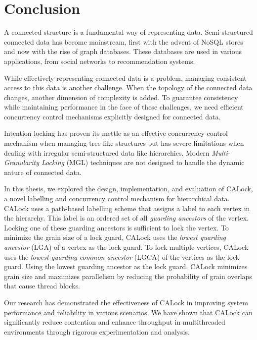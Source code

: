 %

\chapter{Conclusion} \label{chap:conclusion}

A connected structure is a fundamental way of representing data. Semi-structured connected data has become mainstream, first with the advent of NoSQL stores and now with the rise of graph databases. These databases are used in various applications, from social networks to recommendation systems. 

While effectively representing connected data is a problem, managing consistent access to this data is another challenge. When the topology of the connected data changes, another dimension of complexity is added. To guarantee consistency while maintaining performance in the face of these challenges, we need efficient concurrency control mechanisms explicitly designed for connected data.

Intention locking has proven its mettle as an effective concurrency control mechanism when managing tree-like structures but has severe limitations when dealing with irregular semi-structured data like hierarchies. Modern \emph{Multi-Granularity Locking} (MGL) techniques are not designed to handle the dynamic nature of connected data.

In this thesis, we explored the design, implementation, and evaluation of CALock, a novel labelling and concurrency control mechanism for hierarchical data. CALock uses a path-based labelling scheme that assigns a label to each vertex in the hierarchy. This label is an ordered set of all \emph{guarding ancestors} of the vertex. Locking one of these guarding ancestors is sufficient to lock the vertex. To minimize the grain size of a lock guard, CALock uses the \emph{lowest guarding ancestor} (LGA) of a vertex as the lock guard. To lock multiple vertices, CALock uses the \emph{lowest guarding common ancestor} (LGCA) of the vertices as the lock guard. Using the lowest guarding ancestor as the lock guard, CALock minimizes grain size and maximizes parallelism by reducing the probability of grain overlaps that cause thread blocks.




Our research has demonstrated the effectiveness of CALock in improving system performance and reliability in various scenarios. We have shown that CALock can significantly reduce contention and enhance throughput in multithreaded environments through rigorous experimentation and analysis.

